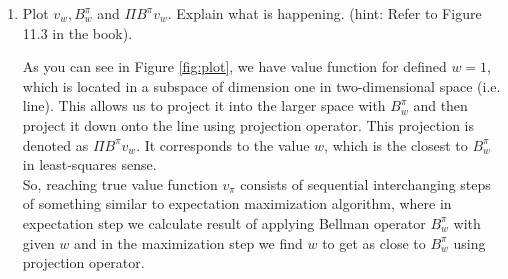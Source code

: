 \documentclass{exam}
\begin{document}
\begin{problem}
\begin{enumerate}
\begin{solutionorlines}[2in]
    \end{solutionorlines}
    \item Plot $v_w , B_w^{\pi}$ and $ΠB^{\pi}v_w$. Explain what is happening. (hint: Refer to Figure 11.3 in the book).
    \begin{solutionorlines}[2in]
    As you can see in Figure \ref{fig:plot}, we have value function for defined $w=1$, which is located in a subspace of dimension one in two-dimensional space (i.e. line). This allows us to project it into the larger space with $B_w^{\pi}$ and then project it down onto the line using projection operator. This projection is denoted as $ΠB^{\pi}v_w$. It corresponds to the value $w$, which is the closest to $B_w^{\pi}$ in least-squares sense.\\
    
    So, reaching true value function $v_{\pi}$ consists of sequential interchanging steps of something similar to expectation maximization algorithm, where in expectation step we calculate result of applying Bellman operator $B_w^{\pi}$ with given $w$ and in the maximization step we find $w$ to get as close to $B_w^{\pi}$ using projection operator.
        
    
    \end{solutionorlines}
\end{enumerate}
\end{problem}
\end{document}
